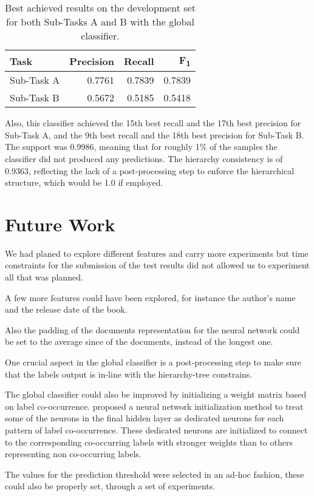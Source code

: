 \documentclass[11pt,a4paper]{article}
\begin{document}
\begin{table}[!h]
\begin{center}
\begin{tabular}{|l|r|r|r|}
\hline\centering\textbf{Task}  & \textbf{Precision} &  \textbf{Recall} &  \textbf{F\textsubscript{1}}\\
\hline
 Sub-Task A   &  0.7761 & 0.7839 & 0.7839 \\
 Sub-Task B   &  0.5672 & 0.5185 & 0.5418 \\
\hline
\end{tabular}
\end{center}
\caption{\label{global_devset-results} Best achieved results on the development
          set for both Sub-Tasks A and B with the global classifier.}
\end{table}

Also, this classifier achieved the 15th best recall and the 17th best precision
for Sub-Task A, and the 9th best recall and the 18th best precision for Sub-Task B.
The support was 0.9986, meaning that for roughly 1\% of the samples the classifier
did not produced any predictions. The hierarchy consistency is of 0.9363, reflecting
the lack of a post-processing step to enforce the hierarchical structure,
which would be 1.0 if employed.

\section{Future Work}\label{future}

We had planed to explore different features and carry more experiments but time
constraints for the submission of the test results did not allowed us to experiment
all that was planned.

A few more features could have been explored, for instance the author's name
and the release date of the book.

Also the padding of the documents representation for the neural network could be
set to the average since of the documents, instead of the longest one.

One crucial aspect in the global classifier is a post-processing step to make
sure that the labels output is in-line with the hierarchy-tree constrains.

The global classifier could also be improved by initializing a weight matrix
based on label co-occurrence. \citet{kurata-etal-2016-improved} proposed a neural
network initialization method to treat some of the neurons in the final hidden
layer as dedicated neurons for each pattern of label co-occurrence. These dedicated
neurons are initialized to connect to the corresponding co-occurring labels with
stronger weights than to others representing non co-occurring labels.

The values for the prediction threshold were selected in an ad-hoc fashion, these
could also be properly set, through a set of experiments.



\end{document}
